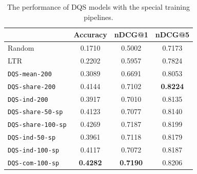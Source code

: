 \begin{table}[t]
\caption{The performance of DQS models with the special training pipelines.}
\centering
\begin{tabular}{lccc}
\toprule
                              & Accuracy             & nDCG@1          & nDCG@5          \\ 
\midrule
Random                        & 0.1710          & 0.5002          & 0.7173  \\
LTR                    & 0.2202          & 0.5957          & 0.7824 \\
\texttt{DQS-mean-200}                  & 0.3089          & 0.6691          & 0.8053          \\
\texttt{DQS-share-200}                 & 0.4144          & 0.7102          & \textbf{0.8224}          \\
\texttt{DQS-ind-200}                   & 0.3917          & 0.7010          & 0.8135          \\
\midrule
\texttt{DQS-share-50-sp}     & 0.4123          & 0.7077          & 0.8140          \\
\texttt{DQS-share-100-sp}    & 0.4269          & 0.7187          & 0.8199          \\
\texttt{DQS-ind-50-sp}       & 0.3961          & 0.7118          & 0.8179          \\
\texttt{DQS-ind-100-sp}      & 0.4117          & 0.7072          & 0.8187          \\
\texttt{DQS-com-100-sp}  & \textbf{0.4282} & \textbf{0.7190} & 0.8206          \\ 
\bottomrule
\end{tabular}
\label{special-train-results}
\end{table}

